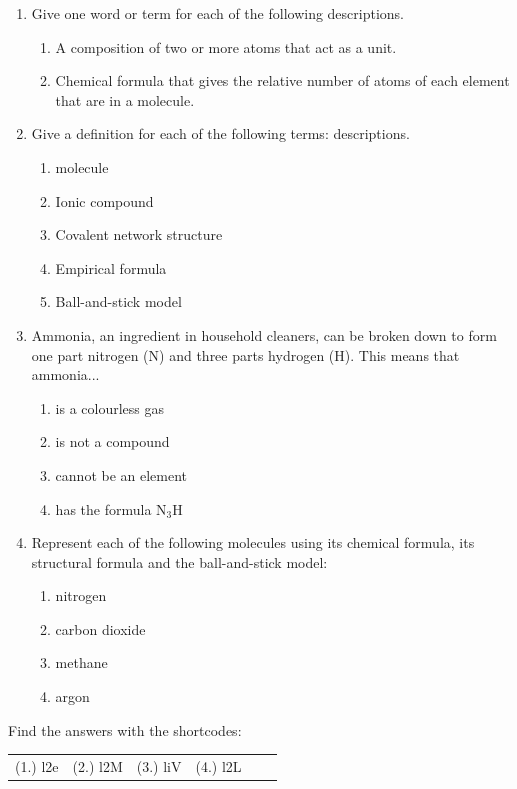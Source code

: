            \label{m38120*id311490}\begin{enumerate}[noitemsep, label=\textbf{\arabic*}. ] 
            \label{m38120*uid87}\item Give one word or term for each of the following 
descriptions.
\label{m38120*id34411506}\begin{enumerate}[noitemsep, label=\textbf{\alph*}. ] 
            \label{m38120*uid90}\item A composition of two or more atoms that act as a unit.
\label{m38120*uid9221}\item Chemical formula that gives the relative number of atoms 
of each element that are in a molecule.
\end{enumerate}
\label{m38120*uid227}\item Give a definition for each of the following terms: 
descriptions.
\label{m38120*id311506}\begin{enumerate}[noitemsep, label=\textbf{\alph*}. ] 
            \label{m38120*uid930}\item molecule
\label{m38120*uid91}\item Ionic compound
\item Covalent network structure\item Empirical formula\item Ball-and-stick model\end{enumerate}
\label{m38120*uid92}\item Ammonia, an ingredient in household cleaners, can be broken down to 
form one part nitrogen ($\mathrm{N}$) and three parts hydrogen ($\mathrm{H}$). This means that 
ammonia...
\label{m38120*id311590}\begin{enumerate}[noitemsep, label=\textbf{\alph*}. ] 
            \label{m38120*uid94}\item is a 
colourless gas
\label{m38120*uid95}\item is not a compound
\label{m38120*uid96}\item cannot be an element
\label{m38120*uid97}\item has the formula ${\mathrm{N}}_{3}\mathrm{H}$
\end{enumerate}
        \item Represent each of the following molecules using its chemical formula, its structural formula and the ball-and-stick model:
\label{m38120*id524}\begin{enumerate}[noitemsep, label=\textbf{\alph*}. ] 
            \item nitrogen\item carbon dioxide\item methane\item argon\end{enumerate}
\end{enumerate}
  \label{m38120**end}
\par {} Find the answers with the shortcodes:
 \par \begin{tabular}[h]{cccccc}
 (1.) l2e  &  (2.) l2M  &  (3.) liV  &  (4.) l2L  & \end{tabular}
